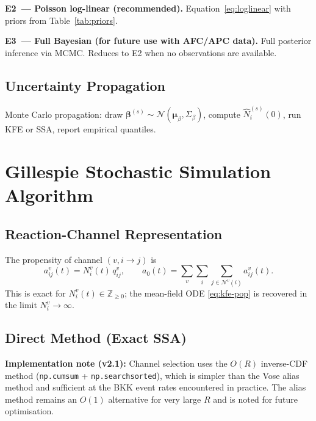 \documentclass[11pt,a4paper]{article}
\theoremstyle{plain}
\theoremstyle{definition}
\theoremstyle{remark}
\begin{document}
\textbf{E2~--- Poisson log-linear (recommended).}
Equation~\eqref{eq:loglinear} with priors from Table~\ref{tab:priors}.

\textbf{E3~--- Full Bayesian (for future use with AFC/APC data).}
Full posterior inference via MCMC.  Reduces to E2 when no observations are
available.

\subsection{Uncertainty Propagation}

Monte Carlo propagation: draw
$\boldsymbol{\beta}^{(s)}\sim\mathcal{N}(\boldsymbol{\mu}_\beta,\Sigma_\beta)$,
compute $\hat{N}^{(s)}_i(0)$, run KFE or SSA, report empirical quantiles.

\section{Gillespie Stochastic Simulation Algorithm}
\label{sec:ssa}

\subsection{Reaction-Channel Representation}

The propensity of channel $(v,i\to j)$ is
\begin{equation}
  a^v_{ij}(t)=N^v_i(t)\,q^v_{ij},\qquad
  a_0(t)=\sum_v\sum_i\sum_{j\in\mathcal{N}^v(i)}a^v_{ij}(t).
\end{equation}
This is exact for $N^v_i(t)\in\mathbb{Z}_{\ge0}$; the mean-field ODE
\eqref{eq:kfe-pop} is recovered in the limit $N^v_i\to\infty$.

\subsection{Direct Method (Exact SSA)}

\textbf{Implementation note (v2.1):}  Channel selection uses the $O(R)$
inverse-CDF method (\texttt{np.cumsum} + \texttt{np.searchsorted}), which is
simpler than the Vose alias method \cite{vose1991} and sufficient at the BKK
event rates encountered in practice.  The alias method remains an $O(1)$
alternative for very large $R$ and is noted for future optimisation.
\end{document}
